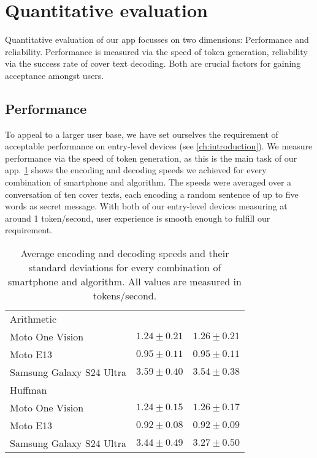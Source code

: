 \section{Quantitative evaluation}
\label{sec:quantitativeEvaluation}
Quantitative evaluation of our app focusses on two dimensions: Performance and reliability. Performance is measured via the speed of token generation, reliability via the success rate of cover text decoding. Both are crucial factors for gaining acceptance amongst users.

\subsection{Performance}
\label{sec:performance}
To appeal to a larger user base, we have set ourselves the requirement of acceptable performance on entry-level devices (see \cref{ch:introduction}). We measure performance via the speed of token generation, as this is the main task of our app. \cref{tab:performance} shows the encoding and decoding speeds we achieved for every combination of smartphone and algorithm. The speeds were averaged over a conversation of ten cover texts, each encoding a random sentence of up to five words as secret message. With both of our entry-level devices measuring at around 1 token/second, user experience is smooth enough to fulfill our requirement.

\begin{table}
	\centering
	\begin{tabular}{@{} lrr @{}} %
		\toprule
		\tableheadline{Device} & \tableheadline{Encoding} & \tableheadline{Decoding} \\
		\midrule
        Arithmetic               &                 &                 \\
		\midrule
        Moto One Vision          & $1.24 \pm 0.21$ & $1.26 \pm 0.21$ \\
		Moto E13                 & $0.95 \pm 0.11$ & $0.95 \pm 0.11$ \\
        Samsung Galaxy S24 Ultra & $3.59 \pm 0.40$ & $3.54 \pm 0.38$ \\
        \midrule
        Huffman                  &                 &                 \\
        \midrule
        Moto One Vision          & $1.24 \pm 0.15$ & $1.26 \pm 0.17$ \\
		Moto E13                 & $0.92 \pm 0.08$ & $0.92 \pm 0.09$ \\
        Samsung Galaxy S24 Ultra & $3.44 \pm 0.49$ & $3.27 \pm 0.50$ \\
		\bottomrule
	\end{tabular}
	\caption[Performance measurements]{Average encoding and decoding speeds and their standard deviations for every combination of smartphone and algorithm. All values are measured in tokens/second.}
	\label{tab:performance}
\end{table}

